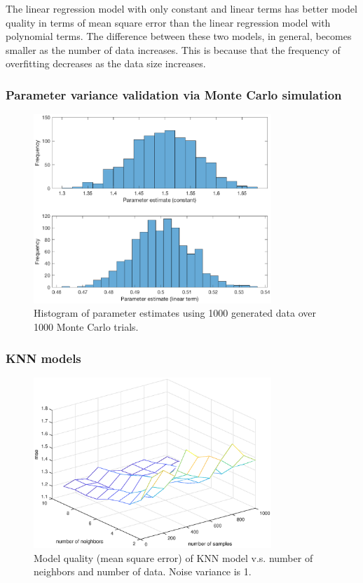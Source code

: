 \documentclass[]{article}
\begin{document}
The linear regression model with only constant and linear terms has better model quality in terms of mean square error than the linear regression model with polynomial terms. The difference between these two models, in general, becomes smaller as the number of data increases. This is because that the frequency of overfitting decreases as the data size increases. 


\subsubsection{Parameter variance validation via Monte Carlo simulation}
\begin{figure}[H]
	\caption{Histogram of parameter estimates using 1000 generated data over 1000 Monte Carlo trials.}
	\centering
	\includegraphics[width=0.8\textwidth]{project3c2}
\end{figure}

\subsubsection{KNN models}
\begin{figure}[H]
	\caption{Model quality (mean square error) of KNN model v.s. number of neighbors and number of data. Noise variance is 1.}
	\label{fig:KNNnumberofdata}
	\centering
	\includegraphics[width=0.8\textwidth]{project3d1}
\end{figure}
\end{document}
